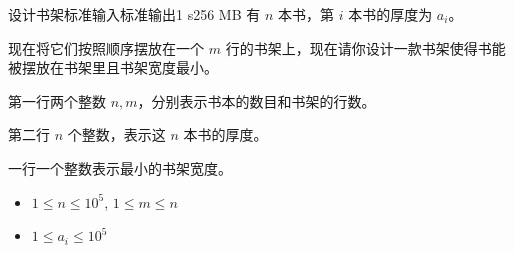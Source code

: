 \begin{problem}{设计书架}{标准输入}{标准输出}{1 s}{256 MB}
有 $n$ 本书，第 $i$ 本书的厚度为 $a_i$。

现在将它们按照顺序摆放在一个 $m$ 行的书架上，现在请你设计一款书架使得书能被摆放在书架里且书架宽度最小。

\InputFile
第一行两个整数 $n, m$，分别表示书本的数目和书架的行数。

第二行 $n$ 个整数，表示这 $n$ 本书的厚度。

\OutputFile
一行一个整数表示最小的书架宽度。

\Example

\begin{example}
\end{example}

\Constraints
\begin{itemize}
\item $1 \leq n \leq 10^5$, $1 \leq m \leq n$
\item $1 \leq a_i \leq 10^5$
\end{itemize}

\end{problem}
